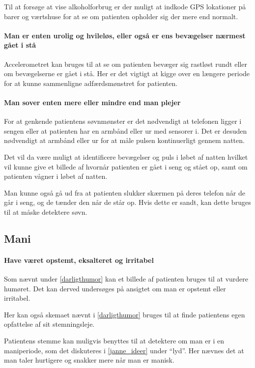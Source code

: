 Til at forsøge at vise alkoholforbrug er der muligt at indkode GPS lokationer på barer og værtshuse for at se om patienten opholder sig der mere end normalt.

\paragraph{Man er enten urolig og hvileløs, eller også er ens bevægelser nærmest gået i stå}
Accelerometret kan bruges til at se om patienten bevæger sig rastløst rundt eller om bevægelserne er gået i stå.
Her er det vigtigt at kigge over en længere periode for at kunne sammenligne adfærdsmønstret for patienten.


\paragraph{Man sover enten mere eller mindre end man plejer}
For at genkende patientens søvnmønster er det nødvendigt at telefonen ligger i sengen eller at patienten har en armbånd eller ur med sensorer i.
Det er desuden nødvendigt at armbånd eller ur for at måle pulsen kontinuerligt gennem natten.

Det vil da være muligt at identificere bevægelser og puls i løbet af natten hvilket vil kunne give et billede af hvornår patienten er gået i seng og stået op, samt om patienten vågner i løbet af natten.

Man kunne også gå ud fra at patienten slukker skærmen på deres telefon når de går i seng, og de tænder den når de står op. Hvis dette er sandt, kan dette bruges til at måske detektere søvn.

\subsection{Mani}

\paragraph{Have været opstemt, eksalteret og irritabel}
Som nævnt under \cref{darligthumor} kan et billede af patienten bruges til at vurdere humøret. 
Det kan derved undersøges på ansigtet om man er opstemt eller irritabel.

Her kan også skemaet nævnt i \cref{darligthumor} bruges til at finde patientens egen opfattelse af sit stemningsleje.

Patientens stemme kan muligvis benyttes til at detektere om man er i en maniperiode, som det diskuteres i \cref{janne_ideer} under ``lyd''. 
Her nævnes det at man taler hurtigere og snakker mere når man er manisk.

